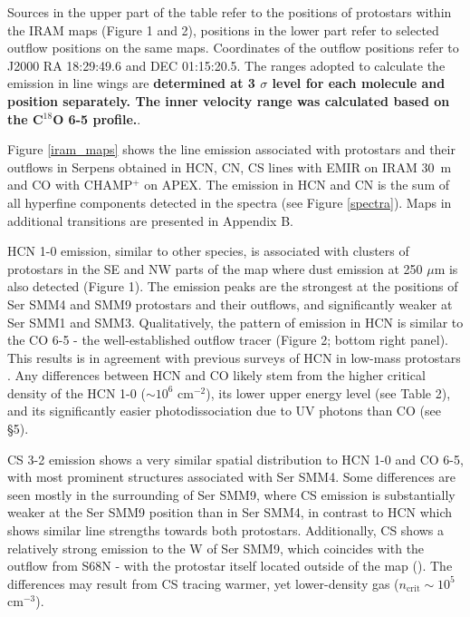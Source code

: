 \documentclass{aa}
\begin{document}
\begin{table*}
\begin{tabular}{l c c c c c c c c c c c c }
\hline \end{tabular} 
\begin{flushleft} Sources in the upper part of the table refer to the positions of protostars
 within the IRAM maps (Figure 1 and 2), positions in the lower part refer to selected
outflow positions on the same maps. Coordinates of the outflow positions refer to J2000 RA 
18:29:49.6 and DEC 01:15:20.5. The ranges adopted to calculate the emission in line wings are \textbf{determined at 3 $\sigma$ level for each molecule and position separately. The inner velocity range was calculated based on the C$^{18}$O 6-5 profile.}.\\
\end{flushleft} 
\end{table*}
Figure \ref{iram_maps} shows the line emission associated with protostars and their outflows in 
Serpens obtained in HCN, CN, CS lines with EMIR on IRAM 30~m and CO with CHAMP$^+$ on APEX. 
The emission in HCN and CN is the sum of all hyperfine components detected in the spectra 
(see Figure \ref{spectra}). Maps in additional transitions are presented in Appendix B.

HCN 1-0 emission, similar to other species, is associated with clusters of protostars 
in the SE and NW parts of the map where dust emission at 250 $\mu$m is also detected (Figure 1). 
The emission peaks are the strongest at the positions of Ser SMM4 and SMM9 protostars and their outflows,
and significantly weaker at Ser SMM1 and SMM3. Qualitatively, the pattern of emission in
 HCN is similar to the CO 6-5 - the well-established outflow tracer (Figure 2; bottom right panel). 
 This results is in agreement with previous surveys of HCN in low-mass protostars \citep{Bac01,Wal14}.
 Any differences between HCN and CO likely stem from the higher critical density of the 
 HCN 1-0 ($\sim10^6$ cm$^{-2}$), its lower upper energy level (see Table 2), and its 
 significantly easier photodissociation due to UV photons than CO (see \S 5). 

CS 3-2 emission shows a very similar spatial distribution to HCN 1-0 and CO 6-5, with most 
prominent structures associated with Ser SMM4. Some differences are seen mostly in the 
surrounding of Ser SMM9, where CS emission is substantially weaker at the Ser SMM9 position 
than in Ser SMM4, in contrast to HCN which shows similar line strengths towards both protostars. 
Additionally, CS shows a relatively strong emission to the W of Ser SMM9, which coincides 
with the outflow from S68N - with the protostar itself located outside of the map (\citealt{Kri10}).
The differences may result from CS tracing warmer, yet lower-density gas ($n_\mathrm{crit}\sim 10^5$ cm$^{-3}$).
\end{document}
